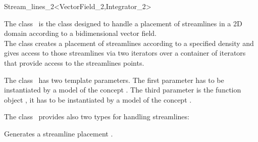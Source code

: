 

\ccModifierCrossRefOff
\begin{ccRefClass}{Stream_lines_2<VectorField_2,Integrator_2>}  %


\ccDefinition
  
The class \ccRefName\ is the class designed to handle a placement of
streamlines in a 2D domain according to a bidimensional vector
field.\\
The class \ccRefName  creates a placement of streamlines according to a 
specified density and gives access to those streamlines via two
iterators over a container of iterators that provide access to the
streamlines points.

\ccParameters
The class \ccRefName\ has two template parameters. The first parameter
 has to be instantiated by a model of the concept
. The third parameter is the function object
, it has to be instantiated by a model of the concept
.

\ccTypes
{}
\ccGlue
{}
\ccGlue
{}

The class \ccRefName\ provides also two types for handling
streamlines:

\ccGlue
{}
\ccGlue



\ccCreation
{}  %


\ccThreeToTwo
{}
{Generates a streamline placement \ccVar.}


\end{ccRefClass}
